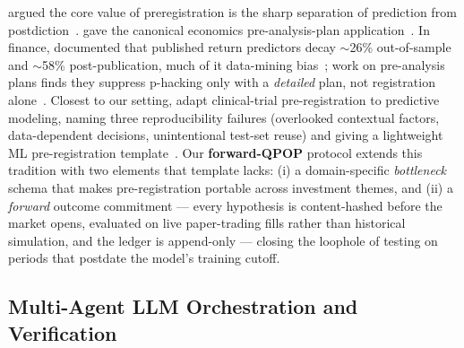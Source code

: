 \documentclass[11pt]{article}
\begin{document}
\citet{nosek2018preregistration} argued the core value of preregistration is
the sharp separation of prediction from
postdiction~\citep{nosek2018preregistration}. \citet{casey2012reshaping} gave
the canonical economics pre-analysis-plan
application~\citep{casey2012reshaping}. In finance,
\citet{mclean2016academic} documented that published return predictors decay
$\sim$26\% out-of-sample and $\sim$58\% post-publication, much of it
data-mining bias~\citep{mclean2016academic}; work on pre-analysis plans finds
they suppress p-hacking only with a \emph{detailed} plan, not registration
alone~\citep{brodeur2024preregistration}. Closest to our setting,
\citet{hofman2023preregistration} adapt clinical-trial pre-registration to
predictive modeling, naming three reproducibility failures (overlooked
contextual factors, data-dependent decisions, unintentional test-set reuse) and
giving a lightweight ML pre-registration
template~\citep{hofman2023preregistration}. Our \textbf{forward-QPOP} protocol
extends this tradition with two elements that template lacks: (i) a
domain-specific \emph{bottleneck} schema that makes pre-registration portable
across investment themes, and (ii) a \emph{forward} outcome commitment ---
every hypothesis is content-hashed before the market opens, evaluated on live
paper-trading fills rather than historical simulation, and the ledger is
append-only --- closing the loophole of testing on periods that postdate the
model's training cutoff.

\subsection{Multi-Agent LLM Orchestration and Verification}
\end{document}
